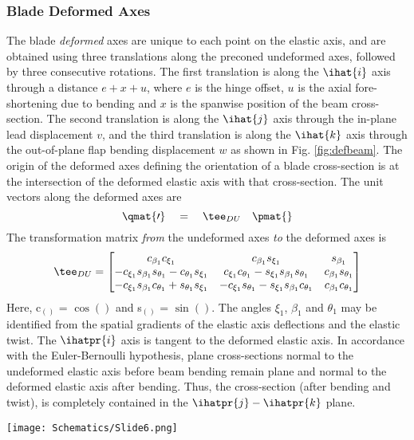 \subsubsection{Blade Deformed Axes} 
\label{sec:bda}
The blade \emph{deformed} axes are unique to each point on the elastic axis, and are obtained using three translations along the preconed undeformed axes, followed by three consecutive rotations. The first translation is along the $\ihat{i}$ axis through a distance $e + x + u$, where $e$ is the hinge offset, $u$ is the axial fore-shortening due to bending and $x$ is the spanwise position of the beam cross-section. The second translation is along the $\ihat{j}$ axis through the in-plane lead displacement $v$, and the third translation is along the $\ihat{k}$ axis through the out-of-plane flap bending displacement $w$ as shown in Fig. \ref{fig:defbeam}. The origin of the deformed axes defining the orientation of a blade cross-section is at the intersection of the deformed elastic axis with that cross-section. The unit vectors along the deformed axes are
\begin{equation}
\label{eqn:TDU1}
\qmat{\prime} \quad = \quad \tee_{DU} \quad \pmat{}
\end{equation}
The transformation matrix \textit{from} the undeformed axes \textit{to} the deformed axes is
\begin{equation}
\label{eqn:TDU2}
\tee_{DU} = \begin{bmatrix}
c_{\beta_1} c_{\xi_1} & c_{\beta_1} s_{\xi_1} & s_{\beta_1} \\
-c_{\xi_1} s_{\beta_1} s_{\theta_1} - c_{\theta_1}s_{\xi_1} & c_{\xi_1} c_{\theta_1} - s_{\xi_1} s_{\beta_1} s_{\theta_1} & c_{\beta_1} s_{\theta_1} \\
-c_{\xi_1} s_{\beta_1} c_{\theta_1} + s_{\theta_1} s_{\xi_1} & -c_{\xi_1} s_{\theta_1} - s_{\xi_1} s_{\beta_1} c_{\theta_1} & c_{\beta_1} c_{\theta_1} \end{bmatrix}
\end{equation}
Here, c$_{()}$ = $\cos()$ and s$_{()}$ = $\sin()$. The angles $\xi_1$, $\beta_1$ and $\theta_1$ may be identified from the spatial gradients of the elastic axis deflections and the elastic twist. The $\ihatpr{i}$ axis is tangent to the deformed elastic axis. In accordance with the Euler-Bernoulli hypothesis, plane cross-sections normal to the undeformed elastic axis before beam bending remain plane and normal to the deformed elastic axis after bending. Thus, the cross-section (after bending and twist), is completely contained in the $\ihatpr{j}- \ihatpr{k}$ plane. 
\begin{Figure}
 \centering
 \texttt{[image: Schematics/Slide6.png]}
 \vspace{-0.5cm}
 \label{fig:defbeam}
\end{Figure}

